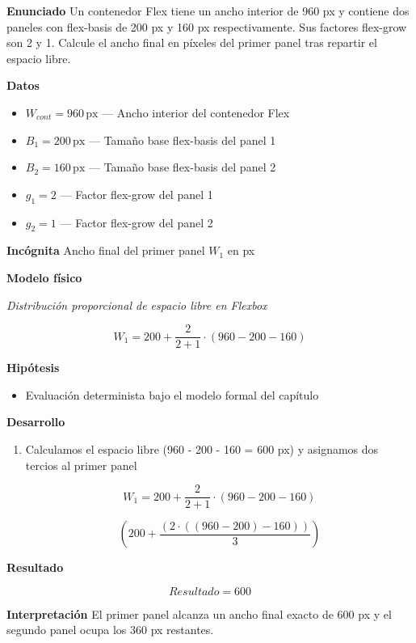 \documentclass{book}
\begin{document}
\begin{tcolorbox}[title={Problema resuelto}, studiumworked, breakable]

\noindent\textbf{Enunciado}
Un contenedor Flex tiene un ancho interior de 960 px y contiene dos paneles con flex-basis de 200 px y 160 px respectivamente. Sus factores flex-grow son 2 y 1. Calcule el ancho final en píxeles del primer panel tras repartir el espacio libre.

\noindent\textbf{Datos}
\begin{itemize}
\item $W_{cont} = 960\,\mathrm{px}$ — Ancho interior del contenedor Flex
\item $B_{1} = 200\,\mathrm{px}$ — Tamaño base flex-basis del panel 1
\item $B_{2} = 160\,\mathrm{px}$ — Tamaño base flex-basis del panel 2
\item $g_{1} = 2$ — Factor flex-grow del panel 1
\item $g_{2} = 1$ — Factor flex-grow del panel 2
\end{itemize}

\noindent\textbf{Incógnita}
Ancho final del primer panel \(W_1\) en px

\noindent\textbf{Modelo físico}

\noindent\textit{Distribución proporcional de espacio libre en Flexbox}

\[
W_1 = 200 + \frac{2}{2 + 1} \cdot (960 - 200 - 160)
\]

\noindent\textbf{Hipótesis}
\begin{itemize}
\item Evaluación determinista bajo el modelo formal del capítulo
\end{itemize}

\noindent\textbf{Desarrollo}
\begin{enumerate}
\item
Calculamos el espacio libre (960 - 200 - 160 = 600 px) y asignamos dos tercios al primer panel

\[
W_1 = 200 + \frac{2}{2 + 1} \cdot (960 - 200 - 160)
\]

\[
\left(200+\frac{\left(2\cdot \left(\left(960-200\right)-160\right)\right)}{3}\right)
\]
\end{enumerate}

\noindent\textbf{Resultado}

\[
Resultado = 600
\]

\noindent\textbf{Interpretación}
El primer panel alcanza un ancho final exacto de 600 px y el segundo panel ocupa los 360 px restantes.


\end{tcolorbox}
\end{document}

